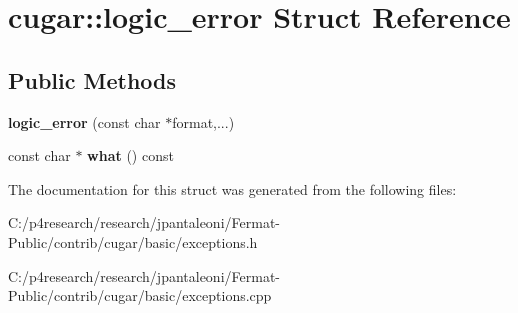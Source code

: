 \hypertarget{structcugar_1_1logic__error}{}\section{cugar\+:\+:logic\+\_\+error Struct Reference}
\label{structcugar_1_1logic__error}
\subsection*{Public Methods}
\begin{DoxyCompactItemize}
\item 
\mbox{\label{structcugar_1_1logic__error_ad7f651a8f9663df16afb1f2006894766}} 
{\bfseries logic\+\_\+error} (const char $\ast$format,...)
\item 
\mbox{\label{structcugar_1_1logic__error_a5dc40fc42250f2c4351d735854513a48}} 
const char $\ast$ {\bfseries what} () const
\end{DoxyCompactItemize}


The documentation for this struct was generated from the following files\+:\begin{DoxyCompactItemize}
\item 
C\+:/p4research/research/jpantaleoni/\+Fermat-\/\+Public/contrib/cugar/basic/exceptions.\+h\item 
C\+:/p4research/research/jpantaleoni/\+Fermat-\/\+Public/contrib/cugar/basic/exceptions.\+cpp\end{DoxyCompactItemize}
